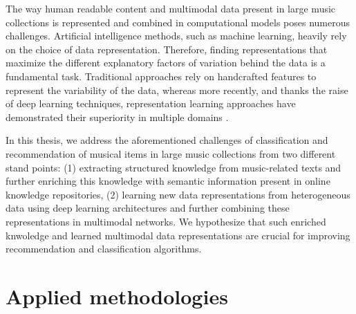 
The way human readable content and multimodal data present in large music collections is represented and combined in computational models poses numerous challenges. Artificial intelligence methods, such as machine learning, heavily rely on the choice of data representation. Therefore, finding representations that maximize the different explanatory factors of variation behind the data is a fundamental task. Traditional approaches rely on handcrafted features to represent the variability of the data, whereas more recently, and thanks the raise of deep learning techniques, representation learning approaches have demonstrated their superiority in multiple domains \citep{bengio2013representation}.

In this thesis, we address the aforementioned challenges of classification and recommendation of musical items in large music collections from two different stand points: (1) extracting structured knowledge from music-related texts and further enriching this knowledge with semantic information present in online knowledge repositories, (2) learning new data representations from heterogeneous data using deep learning architectures and further combining these representations in multimodal networks. %
We hypothesize that such enriched knwoledge and learned multimodal data representations are crucial for improving recommendation and classification algorithms. %

\section{Applied methodologies}

